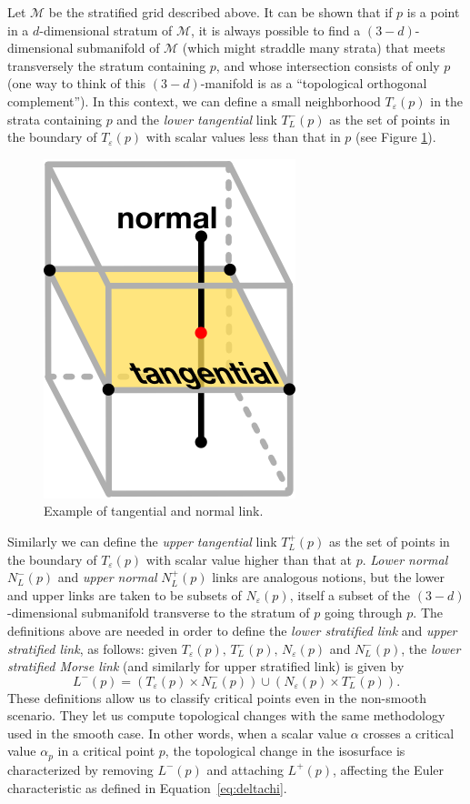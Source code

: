 Let $\mathcal{M}$ be the stratified grid described above.  It can be
shown that if $p$ is a point in a $d$-dimensional stratum of
$\mathcal{M}$, it is always possible to find a $(3-d)$-dimensional
submanifold of $\mathcal{M}$ (which might straddle many strata) that
meets transversely the stratum containing $p$, and whose intersection
consists of only $p$ (one way to think of this $(3-d)$-manifold is as a ``topological orthogonal
complement'').  In this context, we can define a small neighborhood
$T_\varepsilon(p)$ in the strata containing $p$ and the \emph{lower
  tangential} link $T_L^-(p)$ as the set of points in the boundary of
$T_\varepsilon(p)$ with scalar values less than that in $p$ (see Figure \ref{fig:chap4:smt}).
\begin{figure}[b]
\centering
\includegraphics[width=0.15\linewidth]{chapter3/figures/ilustration.png}
\caption{\label{fig:chap4:smt} Example of tangential and normal link.}
\end{figure}
Similarly we can define the \emph{upper tangential} link $T_L^+(p)$ as
the set of points in the boundary of $T_\varepsilon(p)$ with scalar
value higher than that at $p$.  \emph{Lower normal} $N_L^-(p)$ and
\emph{upper normal} $N_L^+(p)$ links are analogous notions, but the
lower and upper links are taken to be subsets of $N_\varepsilon(p)$,
itself a subset of the $(3-d)$-dimensional submanifold transverse to
the stratum of $p$ going through $p$.  The definitions above are needed
in order to define the \emph{lower stratified link} and \emph{upper
  stratified link}, as follows: given $T_\varepsilon(p),\,
T_L^-(p),\,N_\varepsilon(p)$ and $N_L^-(p)$, the \emph{lower
  stratified Morse link} (and similarly for upper stratified link) is
given by
\begin{equation}
L^-(p) = (T_\varepsilon(p) \times N_L^-(p)) \cup (N_\varepsilon(p)
\times T_L^-(p)) \label{eq:lowerstratifiedlink}.
\end{equation}
These definitions allow us to classify critical points even in the non-smooth scenario.
They let us compute topological changes with
the same methodology used in the smooth case. In other words, when a
scalar value $\alpha$ crosses a critical value $\alpha_p$ in a
critical point $p$, the topological change in the isosurface is
characterized by removing $L^-(p)$ and attaching $L^+(p)$, affecting
the Euler characteristic as defined in Equation~\ref{eq:deltachi}.%

